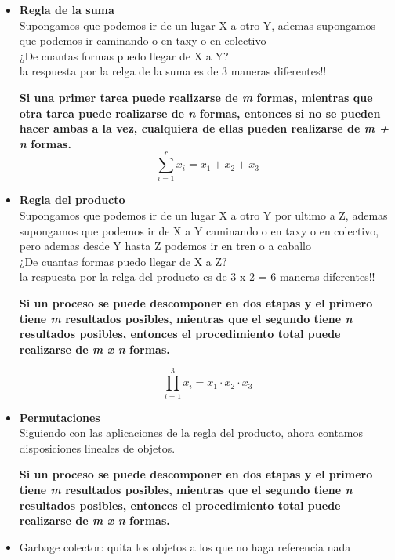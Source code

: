 \documentclass[a4paper,16pt]{article}
\begin{document}
\begin{itemize}
\item \textbf{Regla de la suma}\\   
Supongamos que podemos ir de un lugar X a otro Y, ademas supongamos que podemos ir caminando o en taxy o en colectivo \\¿De cuantas formas puedo llegar de X a Y? \\ la respuesta por la relga de la suma es de 3 maneras diferentes!!
\begin{center}
\textbf{
Si una primer tarea puede realizarse de \textit{m} formas, mientras que otra tarea puede realizarse de \textit{n} formas, entonces si no se pueden hacer ambas a la vez, cualquiera de ellas pueden realizarse de \textit{m + n} formas.}
\[
\sum_{i=1}^{r}x_{i}=x_{1}+x_{2}+x_{3} 
\]

\end{center}

\item \textbf{Regla del producto}\\  
Supongamos que podemos ir de un lugar X a otro Y por ultimo a Z, ademas supongamos que podemos ir de X a Y caminando o en taxy o en colectivo, pero ademas desde Y hasta Z podemos ir en tren o a caballo\\¿De cuantas formas puedo llegar de X a Z? \\ la respuesta por la relga del producto es de 3 x 2 = 6 maneras diferentes!!
\begin{center}
\textbf{
Si un proceso se puede descomponer en dos etapas y el primero tiene \textit{m} resultados posibles, mientras que el segundo tiene \textit{n} resultados posibles, entonces el procedimiento total puede realizarse de \textit{m x n} formas.}

\[
\prod_{i=1}^{3}x_{i}=x_{1}\cdot x_{2}\cdot x_{3} 
\]
\end{center}

\item \textbf{Permutaciones}\\  
Siguiendo con las aplicaciones de la regla del producto, ahora contamos disposiciones lineales de objetos.
\begin{center}
\textbf{
Si un proceso se puede descomponer en dos etapas y el primero tiene \textit{m} resultados posibles, mientras que el segundo tiene \textit{n} resultados posibles, entonces el procedimiento total puede realizarse de \textit{m x n} formas.}
\end{center}




\item Garbage colector: quita los objetos a los que no haga referencia nada
\end{itemize}
\end{document}
